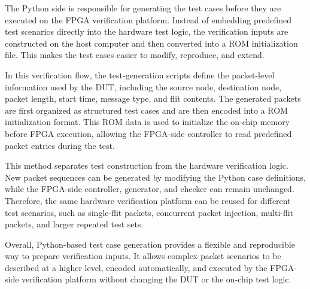 The Python side is responsible for generating the test cases before they are executed on the FPGA verification platform. Instead of embedding predefined test scenarios directly into the hardware test logic, the verification inputs are constructed on the host computer and then converted into a ROM initialization file. This makes the test cases easier to modify, reproduce, and extend.

In this verification flow, the test-generation scripts define the packet-level information used by the DUT, including the source node, destination node, packet length, start time, message type, and flit contents. The generated packets are first organized as structured test cases and are then encoded into a ROM initialization format. This ROM data is used to initialize the on-chip memory before FPGA execution, allowing the FPGA-side controller to read predefined packet entries during the test.

This method separates test construction from the hardware verification logic. New packet sequences can be generated by modifying the Python case definitions, while the FPGA-side controller, generator, and checker can remain unchanged. Therefore, the same hardware verification platform can be reused for different test scenarios, such as single-flit packets, concurrent packet injection, multi-flit packets, and larger repeated test sets.

Overall, Python-based test case generation provides a flexible and reproducible way to prepare verification inputs. It allows complex packet scenarios to be described at a higher level, encoded automatically, and executed by the FPGA-side verification platform without changing the DUT or the on-chip test logic.
